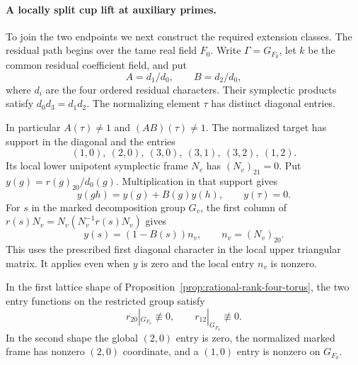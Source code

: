 \paragraph{A locally split cup lift at auxiliary primes.}
\label{par:count-two-cup}
To join the two endpoints we next construct the required extension classes. The
residual path begins over the tame real field \(F_0\).
Write \(\Gamma=G_{F_0}\), let \(k\) be the common residual
coefficient field, and put
\[
 A=d_1/d_0,\qquad B=d_2/d_0 ,
\]
where \(d_i\) are the four ordered residual characters. Their
symplectic products satisfy \(d_0d_3=d_1d_2\). The normalizing
element \(\tau\) has distinct diagonal entries.

In particular
\(A(\tau)\ne1\) and \((AB)(\tau)\ne1\). The normalized target
has support in the diagonal and the entries
\[
 (1,0),\ (2,0),\ (3,0),\ (3,1),\ (3,2),\ (1,2).
\]
Its local lower unipotent symplectic frame \(N_v\) has
\((N_v)_{21}=0\). Put \(y(g)=r(g)_{20}/d_0(g)\).
Multiplication in that support gives
\[
 y(gh)=y(g)+B(g)y(h),\qquad y(\tau)=0 .
\]
For \(s\) in the marked decomposition group \(G_v\), the first
column of \(r(s)N_v=N_v(N_v^{-1}r(s)N_v)\) gives
\[
                    y(s)=(1-B(s))n_v,\qquad n_v=(N_v)_{20}.
\]
This uses the prescribed first diagonal character in the local
upper triangular matrix. It applies even when \(y\) is zero and
the local entry \(n_v\) is nonzero.

\begin{lemma}\label{lem:count-two-target-restriction}
In the first lattice shape of Proposition~\ref{prop:rational-rank-four-torus},
the two entry functions on the restricted group satisfy
\[
 r_{20}|_{G_{F_0}}\not\equiv0,\qquad r_{12}|_{G_{F_0}}\not\equiv0 .
\]
In the second shape the global \((2,0)\) entry is zero, the normalized
marked frame has nonzero \((2,0)\) coordinate, and a \((1,0)\) entry is
nonzero on \(G_{F_0}\).
\end{lemma}

